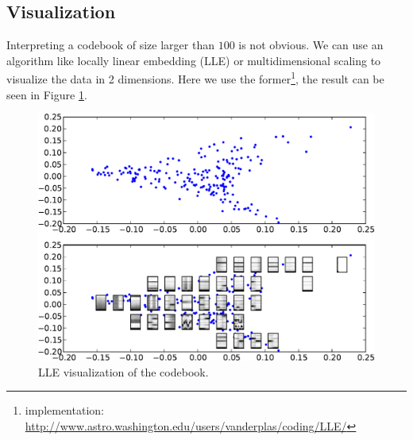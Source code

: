 \documentclass{article}
\begin{document}
\begin{table}
\begin{center}
\end{center}
\caption{{Results with different offset. Always $100$ codes.
\label{tab:offset}}}
\end{table}




\subsection{Visualization}
Interpreting a codebook of size larger than $100$ is not obvious.
We can use an algorithm like locally linear embedding \cite{Roweis2000} (LLE) 
or multidimensional scaling \cite{Kruskal1964} to visualize the data in
2 dimensions. Here we use the former\footnote{implementation: 
\url{http://www.astro.washington.edu/users/vanderplas/coding/LLE/}}, the
result can be seen in Figure \ref{fig:lle}.


\begin{figure}[htb]
\begin{center}
\includegraphics[width=.9\columnwidth]{codes_lle}
\end{center}
\caption{{LLE visualization of the codebook.}}
\label{fig:lle}
\end{figure}
\end{document}

